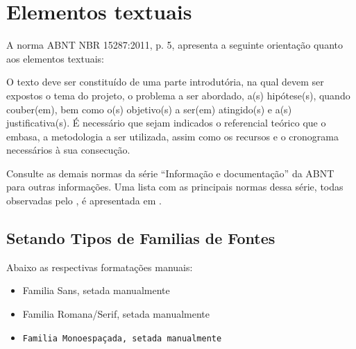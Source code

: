 

    \chapter{Elementos textuais}

    A norma ABNT NBR 15287:2011, p. 5, apresenta a
    seguinte orientação quanto aos elementos textuais:

    \begin{citacao}
    O texto deve ser constituído de uma parte introdutória, na qual devem ser
    expostos o tema do projeto, o problema a ser abordado, a(s) hipótese(s),
    quando couber(em), bem como o(s) objetivo(s) a ser(em) atingido(s) e a(s)
    justificativa(s). É necessário que sejam indicados o referencial teórico que
    o embasa, a metodologia a ser utilizada, assim como os recursos e o cronograma
    necessários à sua consecução.
    \end{citacao}

    Consulte as demais normas da série ``Informação e documentação'' da ABNT
    para outras informações. Uma lista com as principais normas dessa série, todas
    observadas pelo \abnTeX, é apresentada em .

    \section{Setando Tipos de Familias de Fontes}

    Abaixo as respectivas formatações manuais:

    \begin{itemize}

        \item \textsf{Familia Sans, setada manualmente}
        \item \textrm{Familia Romana/Serif, setada manualmente}
        \item \texttt{Familia Monoespaçada, setada manualmente}

    \end{itemize}

